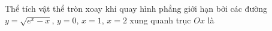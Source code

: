 \begin{ex}
Thể tích vật thể tròn xoay khi quay hình phẳng giới hạn bởi các đường $y=\sqrt{e^x-x}$, $y=0$, $x=1$, $x=2$ xung quanh trục $Ox$ là
\end{ex}
